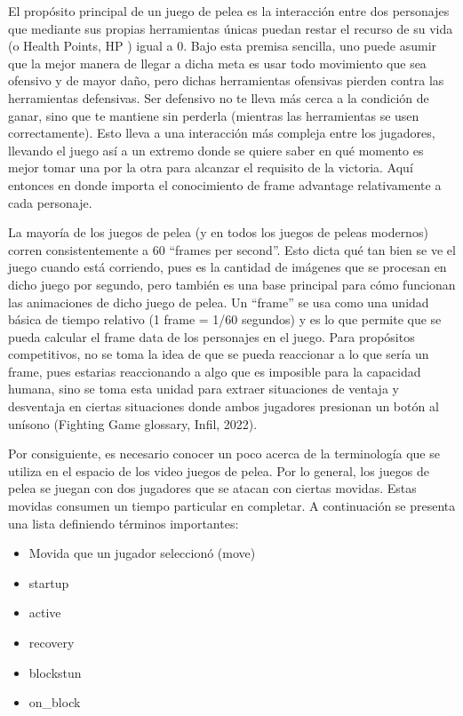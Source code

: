El propósito principal de un juego de pelea es la interacción entre dos personajes que mediante sus propias herramientas únicas puedan restar el recurso de su vida (o Health Points, HP \cite{noauthor_fighting_nodate} ) igual a 0. Bajo esta premisa sencilla, uno puede asumir que la mejor manera de llegar a dicha meta es usar todo movimiento que sea ofensivo y de mayor daño, pero dichas herramientas ofensivas pierden contra las herramientas defensivas. Ser defensivo no te lleva más cerca a la condición de ganar, sino que te mantiene sin perderla (mientras las herramientas se usen correctamente). Esto lleva a una interacción más compleja entre los jugadores, llevando el juego así a un extremo donde se quiere saber en qué momento es mejor tomar una por la otra para alcanzar el requisito de la victoria. Aquí entonces en donde importa el conocimiento de frame advantage relativamente a cada personaje. 

La mayoría de los juegos de pelea (y en todos los juegos de peleas modernos) corren consistentemente a 60 “frames per second”. Esto dicta qué tan bien se ve el juego cuando está corriendo, pues es la cantidad de imágenes que se procesan en dicho juego por segundo, pero también es una base principal para cómo funcionan las animaciones de dicho juego de pelea. Un “frame” se usa como una unidad básica de tiempo relativo (1 frame = 1/60 segundos) y es lo que permite que se pueda calcular el frame data de los personajes en el juego. Para propósitos competitivos, no se toma la idea de que se pueda reaccionar a lo que sería un frame, pues estarias reaccionando a algo que es imposible para la capacidad humana, sino se toma esta unidad para extraer situaciones de ventaja y desventaja en ciertas situaciones donde ambos jugadores presionan un botón al unísono (Fighting Game glossary, Infil, 2022).

Por consiguiente, es necesario conocer un poco acerca de la terminología que se utiliza en el espacio de los video juegos de pelea. Por lo general, los juegos de pelea se juegan con dos jugadores que se atacan con ciertas movidas. Estas movidas consumen un tiempo particular en completar. A continuación se presenta una lista definiendo términos importantes:
\begin{itemize}
    \item Movida que un jugador seleccionó (move)
    \item \gls{startup}
    \item \gls{active}
    \item \gls{recovery}
    \item \gls{blockstun}
    \item \gls{on_block}
\end{itemize}

